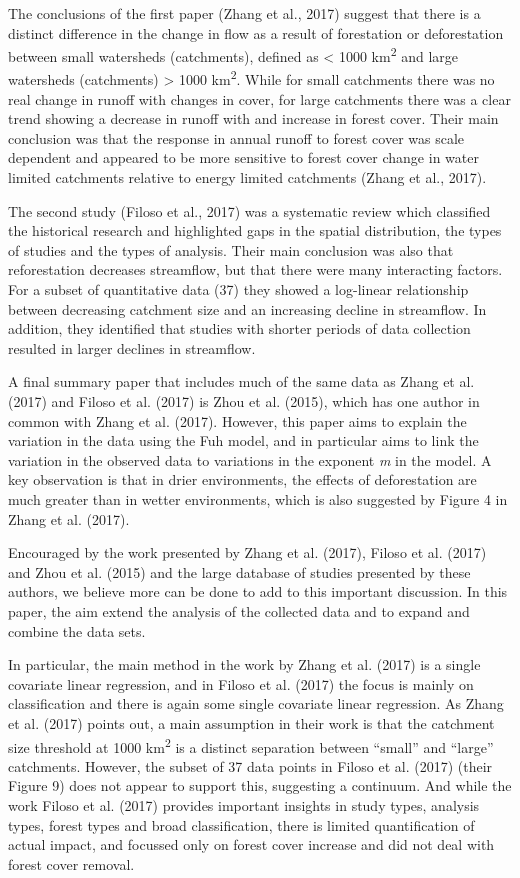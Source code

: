 \documentclass[]{elsarticle} %
\begin{document}
The conclusions of the first paper (Zhang et al., 2017) suggest that there is a distinct difference in the change in flow as a result of forestation or deforestation between small watersheds (catchments), defined as \textless{} 1000 km\textsuperscript{2} and large watersheds (catchments) \textgreater{} 1000 km\textsuperscript{2}. While for small catchments there was no real change in runoff with changes in cover, for large catchments there was a clear trend showing a decrease in runoff with and increase in forest cover. Their main conclusion was that the response in annual runoff to forest cover was scale dependent and appeared to be more sensitive to forest cover change in water limited catchments relative to energy limited catchments (Zhang et al., 2017).

The second study (Filoso et al., 2017) was a systematic review which classified the historical research and highlighted gaps in the spatial distribution, the types of studies and the types of analysis. Their main conclusion was also that reforestation decreases streamflow, but that there were many interacting factors. For a subset of quantitative data (37) they showed a log-linear relationship between decreasing catchment size and an increasing decline in streamflow. In addition, they identified that studies with shorter periods of data collection resulted in larger declines in streamflow.

A final summary paper that includes much of the same data as Zhang et al. (2017) and Filoso et al. (2017) is Zhou et al. (2015), which has one author in common with Zhang et al. (2017). However, this paper aims to explain the variation in the data using the Fuh model, and in particular aims to link the variation in the observed data to variations in the exponent \emph{m} in the model. A key observation is that in drier environments, the effects of deforestation are much greater than in wetter environments, which is also suggested by Figure 4 in Zhang et al. (2017).

Encouraged by the work presented by Zhang et al. (2017), Filoso et al. (2017) and Zhou et al. (2015) and the large database of studies presented by these authors, we believe more can be done to add to this important discussion. In this paper, the aim extend the analysis of the collected data and to expand and combine the data sets.

In particular, the main method in the work by Zhang et al. (2017) is a single covariate linear regression, and in Filoso et al. (2017) the focus is mainly on classification and there is again some single covariate linear regression. As Zhang et al. (2017) points out, a main assumption in their work is that the catchment size threshold at 1000 km\textsuperscript{2} is a distinct separation between ``small'' and ``large'' catchments. However, the subset of 37 data points in Filoso et al. (2017) (their Figure 9) does not appear to support this, suggesting a continuum. And while the work Filoso et al. (2017) provides important insights in study types, analysis types, forest types and broad classification, there is limited quantification of actual impact, and focussed only on forest cover increase and did not deal with forest cover removal.
\end{document}
